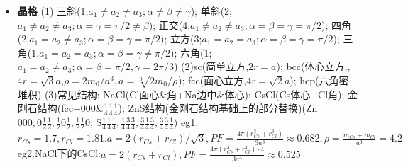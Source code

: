 \documentclass[UTF8,a4paper,1pt,twocolumn]{ctexart}
\begin{document}
\begin{itemize}


  \item \textbf{晶格}
  (1)
  三斜(1;$a_1\neq a_2\neq a_3;\alpha\neq\beta\neq\gamma$);
  单斜(2;$a_1\neq a_2\neq a_3;\alpha=\gamma=\pi/2\neq\beta$);
  正交(4;$a_1\neq a_2\neq a_3;\alpha=\beta=\gamma=\pi/2$);
  四角(2,$a_1=a_2\neq a_3;\alpha=\beta=\gamma=\pi/2$);
  立方(3;$a_1=a_2=a_3;\alpha=\beta=\gamma=\pi/2$);
  三角(1,$a_1=a_2=a_3;\alpha=\beta=\gamma\neq\pi/2$);
  六角(1;$a_1=a_2\neq a_3;\alpha=\beta=\pi/2,\gamma=2\pi/3$)
  (2)sc(简单立方,$2r=a$);
  bcc(体心立方,,$4r=\sqrt{3}a$,$\rho=2m_0/a^3,a=\sqrt[3]{2m_0/\rho}$);
  fcc(面心立方,$4r=\sqrt{2}a$);
  hcp(六角密堆积)
  (3)常见结构:
  NaCl(Cl面心\&角+Na边中\&体心);
  CsCl(Cs体心+Cl角);
  金刚石结构(fcc+$000\&\frac{1}{4}\frac{1}{4}\frac{1}{4}$);
  ZnS结构(金刚石结构基础上的部分替换)(Zn$000,0\frac{1}{2}\frac{1}{2},\frac{1}{2}0\frac{1}{2},\frac{1}{2}\frac{1}{2}0$;
  S$\frac{1}{4}\frac{1}{4}\frac{1}{4},\frac{1}{4}\frac{3}{4}\frac{3}{4},\frac{3}{4}\frac{1}{4}\frac{3}{4},\frac{3}{4}\frac{3}{4}\frac{1}{4}$)
  eg1.$r_{Cs}=1.7,r_{Cl}=1.81.a=2(r_{Cs}+r_{Cl})/\sqrt{3},PF=\frac{4\pi(r_{Cs}^3+r_{Cl}^3)}{3a^3}\approx 0.682,\rho=\frac{m_{Cs}+m_{Cl}}{a^3}=4.2$
  eg2.NaCl下的CsCl:$a=2(r_{Cs}+r_{Cl}),PF=\frac{4\pi(r_{Cs}^3+r_{Cl}^3)\cdot 4}{3a^3}\approx 0.525$



\end{itemize}
\end{document}
